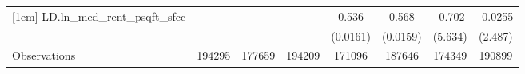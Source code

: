 {\begin{tabular}{l*{7}{c}}
[1em]
LD.ln\_med\_rent\_psqft\_sfcc&                  &                  &                  &    0.536\sym{***}&    0.568\sym{***}&   -0.702         &  -0.0255         \\
          &                  &                  &                  & (0.0161)         & (0.0159)         &  (5.634)         &  (2.487)         \\
\hline
Observations&   194295         &   177659         &   194209         &   171096         &   187646         &   174349         &   190899         \\
\hline\hline
\end{tabular}
}
